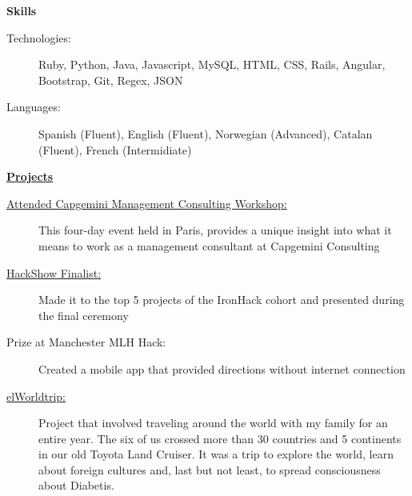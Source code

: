 \documentclass[letterpaper,11pt]{article}
\newcommand{\resheading}[1]{{\large \colorbox{mygrey}{\begin{minipage}{\textwidth}{\textbf{#1 \vphantom{p\^{E}}}}\end{minipage}}}}
\begin{document}
\resheading{Skills}
    \begin{description}
        \item[Technologies:] { \footnotesize Ruby, Python, Java, Javascript, MySQL, HTML, CSS, Rails, Angular, Bootstrap, Git, Regex, JSON}

        \item[Languages:] { \footnotesize
            Spanish (Fluent), English (Fluent), Norwegian (Advanced), Catalan (Fluent), French (Intermidiate)
        }

    \end{description} %

\resheading{\href{http://www.derekhildreth.com/portfolio.php}{Projects}}

\begin{description}
\item[\href{https://www.no.capgemini-consulting.com/careers/management-consulting-workshop}{Attended Capgemini Management Consulting Workshop:}] { \footnotesize This four-day event held in Paris, provides a unique insight into what it means to work as a management consultant at Capgemini Consulting}

\item[\href{https://vimeo.com/107409144}{HackShow Finalist:}] { \footnotesize Made it to the top 5 projects of the IronHack cohort and presented during the final ceremony}

\item[Prize at Manchester MLH Hack:] { \footnotesize Created a mobile app that provided directions without internet connection}

\item[\href{http://elworldtrip.com/}{elWorldtrip:}] { \footnotesize Project that involved traveling around the world with my family for an entire year. The six of us crossed more than 30 countries and 5 continents in our old Toyota Land Cruiser. It was a trip to explore the world, learn about foreign cultures and, last but not least, to spread consciousness about Diabetis.}

\end{description}
\end{document}
